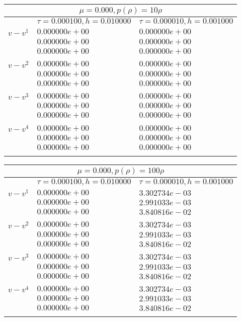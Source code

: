 \documentclass[12pt,a4paper]{article}
\begin{document}
\begin{tabular}{ |l|l|l|}
\hline
\multicolumn{3}{|c|}{$\mu = 0.000, p(\rho) = 10\rho$} \\
\hline
 &$\tau = 0.000100, h = 0.010000$ &$\tau = 0.000010, h = 0.001000$ \\
\hline
$v-v^{1}$& $0.000000e+00$ & $0.000000e+00$ \\
& $0.000000e+00$ & $0.000000e+00$ \\
& $0.000000e+00$ & $0.000000e+00$ \\
\\
\hline
$v-v^{2}$& $0.000000e+00$ & $0.000000e+00$ \\
& $0.000000e+00$ & $0.000000e+00$ \\
& $0.000000e+00$ & $0.000000e+00$ \\
\\
\hline
$v-v^{3}$& $0.000000e+00$ & $0.000000e+00$ \\
& $0.000000e+00$ & $0.000000e+00$ \\
& $0.000000e+00$ & $0.000000e+00$ \\
\\
\hline
$v-v^{4}$& $0.000000e+00$ & $0.000000e+00$ \\
& $0.000000e+00$ & $0.000000e+00$ \\
& $0.000000e+00$ & $0.000000e+00$ \\
\\
\hline
\end{tabular}

\begin{tabular}{ |l|l|l|}
\hline
\multicolumn{3}{|c|}{$\mu = 0.000, p(\rho) = 100\rho$} \\
\hline
 &$\tau = 0.000100, h = 0.010000$ &$\tau = 0.000010, h = 0.001000$ \\
\hline
$v-v^{1}$& $0.000000e+00$ & $3.302734e-03$ \\
& $0.000000e+00$ & $2.991033e-03$ \\
& $0.000000e+00$ & $3.840816e-02$ \\
\\
\hline
$v-v^{2}$& $0.000000e+00$ & $3.302734e-03$ \\
& $0.000000e+00$ & $2.991033e-03$ \\
& $0.000000e+00$ & $3.840816e-02$ \\
\\
\hline
$v-v^{3}$& $0.000000e+00$ & $3.302734e-03$ \\
& $0.000000e+00$ & $2.991033e-03$ \\
& $0.000000e+00$ & $3.840816e-02$ \\
\\
\hline
$v-v^{4}$& $0.000000e+00$ & $3.302734e-03$ \\
& $0.000000e+00$ & $2.991033e-03$ \\
& $0.000000e+00$ & $3.840816e-02$ \\
\\
\hline
\end{tabular}
\end{document}
